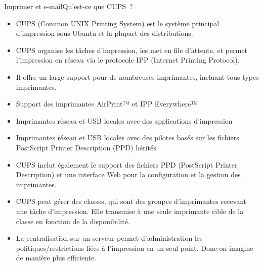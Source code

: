 \documentclass{beamer}
\begin{document}
    \begin{frame}{Imprimer et e-mail}{Qu'est-ce que CUPS~?}
        \begin{footnotesize}
            \begin{itemize}
                \item CUPS (Common UNIX Printing System) est le système principal d'impression sous Ubuntu et la plupart des distributions.
                \item CUPS organise les tâches d'impression, les met en file d'attente, et permet l'impression en réseau via le protocole IPP (Internet Printing Protocol).
                \item Il offre un large support pour de nombreuses imprimantes, incluant tous types imprimantes.
                \item Support des imprimantes AirPrint™ et IPP Everywhere™
                \item Imprimantes réseau et USB locales avec des applications d'impression
                \item Imprimantes réseau et USB locales avec des pilotes basés sur les fichiers PostScript Printer Description (PPD) hérités
                \item CUPS inclut également le support des fichiers PPD (PostScript Printer Description) et une interface Web pour la configuration et la gestion des imprimantes.
                \item CUPS peut gérer des classes, qui sont des groupes d'imprimantes recevant une tâche d'impression.
                Elle transmise à une seule imprimante cible de la classe en fonction de la disponibilité.
                \item La centralisation sur un serveur permet d'administration les politiques/restrictions liées à l'impression en un seul point.
                Donc on imagine de manière plus efficiente.
            \end{itemize}
        \end{footnotesize}
    \end{frame}
\end{document}
